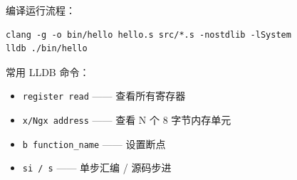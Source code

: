 
编译运行流程：

\begin{verbatim}
clang -g -o bin/hello hello.s src/*.s -nostdlib -lSystem
lldb ./bin/hello
\end{verbatim}

常用 LLDB 命令：
\begin{itemize}
    \item \texttt{register read} —— 查看所有寄存器
    \item \texttt{x/Ngx address} —— 查看 N 个 8 字节内存单元
    \item \texttt{b function\_name} —— 设置断点
    \item \texttt{si / s} —— 单步汇编 / 源码步进
\end{itemize}
